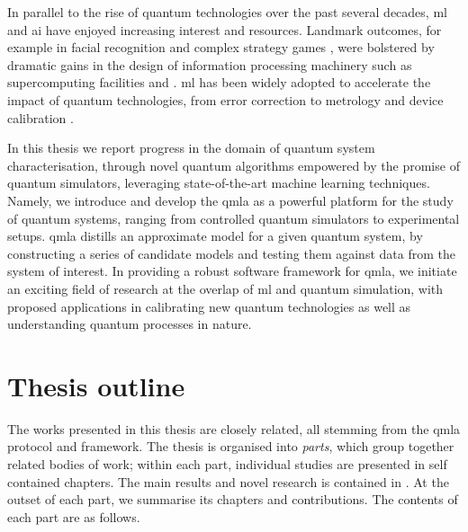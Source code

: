 In parallel to the rise of quantum technologies over the past several decades,
    \gls{ml} and \acrlong{ai} have enjoyed increasing interest and resources.
Landmark outcomes, for example in facial recognition \cite{taigman2014deepface} 
    and complex strategy games \cite{silver2017mastering, brown2019superhuman},
    were bolstered by dramatic gains in the design of information processing machinery
    such as supercomputing facilities \cite{top500} and  \cite{lindholm2008nvidia}.
\Gls{ml} has been widely adopted to accelerate the impact of quantum technologies, 
        from error correction \cite{chen2019machine, valenti2019hamiltonian}
        to metrology \cite{hentschel2010machine}
        and device calibration \cite{lennon2019efficiently}.
    
\par 

In this thesis we report progress in the domain of quantum system characterisation,
    through novel quantum algorithms empowered by the promise of quantum simulators, 
    leveraging state-of-the-art machine learning techniques. 
Namely, we introduce and develop the \gls{qmla} as a powerful platform for the study of 
    quantum systems, ranging from controlled quantum simulators to experimental setups.
\gls{qmla} distills an approximate model for a given quantum system, 
    by constructing a series of candidate models and testing them against data from the system of interest.
In providing a robust software framework for \gls{qmla}, we initiate an exciting field of research 
    at the overlap of \acrlong{ml} and quantum simulation, 
    with proposed applications in calibrating new quantum technologies as well as understanding 
    quantum processes in nature.

\section{Thesis outline}

The works presented in this thesis are closely related, 
    all stemming from the \gls{qmla} protocol and framework. 
The thesis is organised into \emph{parts}, 
    which group together related bodies of work;
    within each part, individual studies are presented in self contained chapters.
The main results and novel research is contained in .  
At the outset of each part, we summarise its chapters and contributions.
The contents of each part are as follows. 

